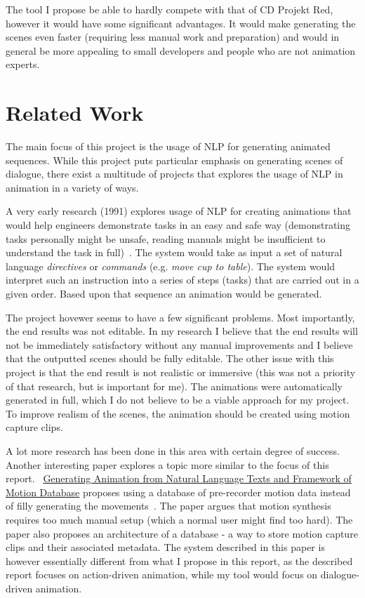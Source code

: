 The tool I propose be able to hardly compete with that of CD Projekt Red, however it would have some significant advantages. It would make generating the scenes even faster (requiring less manual work and preparation) and would in general be more appealing to small developers and people who are not animation experts.

\section{Related Work}
The main focus of this project is the usage of NLP for generating animated sequences. While this project puts particular emphasis on generating scenes of dialogue, there exist a multitude of projects that explores the usage of NLP in animation in a variety of ways.

A very early research (1991) explores usage of NLP for creating animations that would help engineers demonstrate tasks in an easy and safe way (demonstrating tasks personally might be unsafe, reading manuals might be insufficient to understand the task in full)~\cite{animosha}. The system would take as input a set of natural language \textit{directives} or \textit{commands} (e.g. \textit{move cup to table}). The system would interpret such an instruction into a series of steps (tasks) that are carried out in a given order. Based upon that sequence an animation would be generated.

The project hovewer seems to have a few significant problems. Most importantly, the end results was not editable. In my research I believe that the end results will not be immediately satisfactory without any manual improvements and I believe that the outputted scenes should be fully editable. The other issue with this project is that the end result is not realistic or immersive (this was not a priority of that research, but is important for me). The animations were automatically generated in full, which I do not believe to be a viable approach for my project. To improve realism of the scenes, the animation should be created using motion capture clips.

A lot more research has been done in this area with certain degree of success. Another interesting paper explores a topic more similar to the focus of this report. ~\url{Generating Animation from Natural Language Texts and Framework of Motion Database} proposes using a database of pre-recorder motion data instead of filly generating the movements~\cite{animmc}. The paper argues that motion synthesis requires too much manual setup (which a normal user might find too hard). The paper also proposes an architecture of a database -  a way to store motion capture clips and their associated metadata. The system described in this paper is however essentially different from what I propose in this report, as the described report focuses on action-driven animation, while my tool would focus on dialogue-driven animation.

